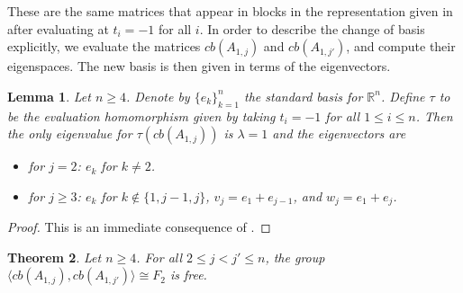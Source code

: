 \documentclass[11pt]{article}
\newtheorem{lemma}{Lemma}[section]
\newtheorem{theorem}[lemma]{Theorem}
\begin{document}
\noindent These are the same matrices that appear in blocks in the representation given in \cite{lip} after evaluating at $t_i=-1$ for all $i$. In order to describe the change of basis explicitly, we evaluate the matrices $cb(A_{1,j})$ and $cb(A_{1,j'})$, and compute their eigenspaces. The new basis is then given in terms of the eigenvectors.

\begin{lemma}\label{lem:eigen}
	Let $n\geq 4$. Denote by $\{e_k\}_{k=1}^n$ the standard basis for $\mathbb{R}^n$. Define $\tau$ to be the evaluation homomorphism given by taking $t_i=-1$ for all $1\leq i \leq n$. Then the only eigenvalue for $\tau(cb(A_{1,j}))$ is $\lambda=1$ and the eigenvectors are
	\begin{itemize}
		\item for $j=2$: $e_k$ for $k\neq 2$.
		\item for $j\geq 3$: $e_k$ for $k\notin\{1,j-1,j\}$, $v_j=e_1+e_{j-1}$, and $w_j=e_1+e_j$.
	\end{itemize}
				
\end{lemma}

\begin{proof}
	This is an immediate consequence of .
\end{proof}

\begin{theorem}\label{thm:main-thm}
	Let $n\geq 4$. For all $2\leq j<j'\leq n$, the group 
	$\langle cb(A_{1,j}),cb(A_{1,j'})\rangle \cong F_2$ is free.
\end{theorem}
\end{document}
